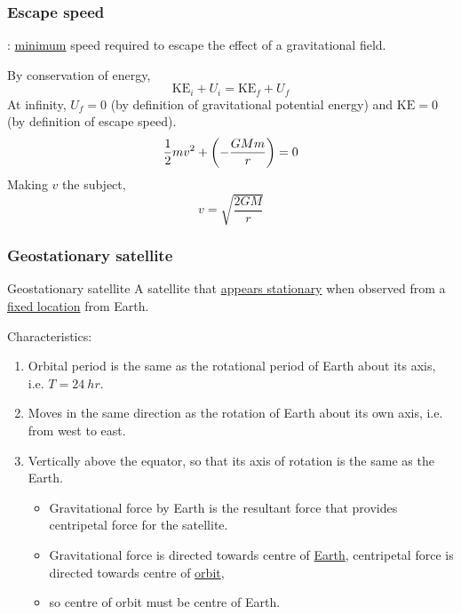 \subsubsection{Escape speed}
: \underline{minimum} speed required to escape the effect of a gravitational field.

By conservation of energy,
\[ \text{KE}_i + U_i = \text{KE}_f + U_f \]
At infinity, $U_f = 0$ (by definition of gravitational potential energy) and $\text{KE}=0$ (by definition of escape speed).
\[ \frac{1}{2} mv^2 + \left(-\frac{GMm}{r}\right) = 0 \]
Making $v$ the subject,
\[ \boxed{v = \sqrt{\frac{2GM}{r}}} \]

\subsubsection{Geostationary satellite}
\begin{defn}{Geostationary satellite}{}
A satellite that \underline{appears stationary} when observed from a \underline{fixed location} from Earth.
\end{defn}

Characteristics:
\begin{enumerate}
\item Orbital period is the same as the rotational period of Earth about its axis, i.e. $T=24\:\unit{hr}$.
\item Moves in the same direction as the rotation of Earth about its own axis, i.e. from west to east.
\item Vertically above the equator, so that its axis of rotation is the same as the Earth.
    \begin{itemize}
    \item Gravitational force by Earth is the resultant force that provides centripetal force for the satellite. 
    \item Gravitational force is directed towards centre of \underline{Earth}, centripetal force is directed towards centre of \underline{orbit},
    \item so centre of orbit must be centre of Earth.
    \end{itemize}
\end{enumerate}
\pagebreak
